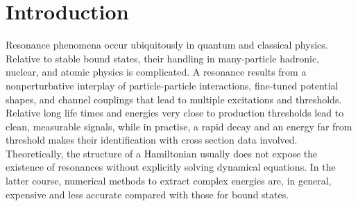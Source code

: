 \documentclass[aps,onecolumn,preprintnumbers,amsmath,amssymb,nofootinbib,superscriptaddress,notitlepage]{revtex4-1}
\begin{document}
\maketitle

\section{Introduction}

Resonance phenomena occur ubiquitously in quantum and classical physics.
Relative to stable bound states, their handling in many-particle hadronic, nuclear,
and atomic physics is complicated. 
A resonance results from a nonperturbative interplay of particle-particle interactions,
fine-tuned potential shapes, and channel couplings that lead to multiple
excitations and thresholds.
Relative long life times and energies very close to production thresholds lead to
clean, measurable signals, while in practise, a rapid decay and an energy far from
threshold makes their identification with cross section data involved. 
Theoretically, the structure of a Hamiltonian usually does not expose the existence of
resonances without explicitly solving dynamical equations. In the latter course,
numerical methods to extract complex energies are, in general, expensive and
less accurate compared with those for bound states.
%
\end{document}
